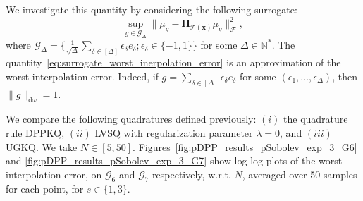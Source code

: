 \documentclass[twoside,11pt]{book}
\numberwithin{theorem}{chapter}
\numberwithin{definition}{chapter}
\numberwithin{proposition}{chapter}
\numberwithin{corollary}{chapter}
\numberwithin{example}{chapter}
\numberwithin{lemma}{chapter}
\numberwithin{assumption}{chapter}
\begin{document}
We investigate this quantity by considering the following surrogate:
\begin{equation}\label{eq:surrogate_worst_inerpolation_error}
\sup\limits_{g \in \mathcal{G}_{\Delta} } \|\mu_{g}-\bm{\Pi}_{\mathcal{T}(\bm{x})} \mu_{g}\|_{\mathcal{F}}^{2},
\end{equation}
where $\mathcal{G}_{\Delta} = \{ \frac{1}{\sqrt{\Delta}} \sum\limits_{\delta \in [\Delta]} \epsilon_{\delta} e_{\delta}; \epsilon_{\delta} \in \{-1,1\}\}$ for some $\Delta \in \mathbb{N}^{*}$. The quantity~\eqref{eq:surrogate_worst_inerpolation_error} is an approximation of the worst interpolation error. Indeed, if $g = \sum\limits_{\delta \in [\Delta]} \epsilon_{\delta} e_{\delta}$ for some $(\epsilon_{1}, \dots, \epsilon_{\Delta})$, then $\|g\|_{\mathrm{d}\omega} = 1$.

We compare the following quadratures defined previously: $(i)$ the quadrature rule DPPKQ, $(ii)$ LVSQ with regularization parameter $\lambda = 0$, and $(iii)$ UGKQ. We take $N \in [5,50]$. Figures~\ref{fig:pDPP_results_pSobolev_exp_3_G6} and \ref{fig:pDPP_results_pSobolev_exp_3_G7} show log-log plots of the worst interpolation error, on $\mathcal{G}_{6}$ and $\mathcal{G}_{7}$ respectively, w.r.t. $N$, averaged over 50 samples for each point, for $s \in \{1,3\}$. 
\end{document}
